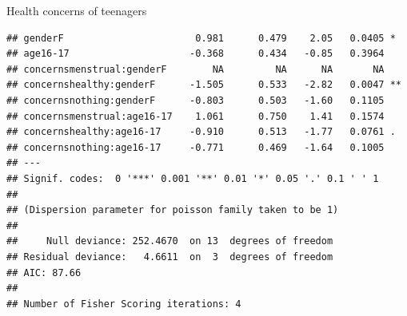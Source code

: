 \documentclass[11pt]{book}\usepackage[]{graphicx}\usepackage[]{color}
\makeatletter
\newenvironment{kframe}{%
 \def\at@end@of@kframe{}%
 \ifinner\ifhmode%
  \def\at@end@of@kframe{\end{minipage}}%
  \begin{minipage}{\columnwidth}%
 \fi\fi%
 \def\FrameCommand##1{\hskip\@totalleftmargin \hskip-\fboxsep
 \colorbox{shadecolor}{##1}\hskip-\fboxsep
     \hskip-\linewidth \hskip-\@totalleftmargin \hskip\columnwidth}%
 \MakeFramed {\advance\hsize-\width
   \@totalleftmargin\z@ \linewidth\hsize
   \@setminipage}}%
 {\par\unskip\endMakeFramed%
 \at@end@of@kframe}
\newenvironment{knitrout}{}{} %
\renewenvironment{knitrout}{\small\renewcommand{\baselinestretch}{.85}}{} %
\makeatother
\begin{document}
\begin{Example}[health]{Health concerns of teenagers}
\begin{knitrout}
\begin{kframe}
\begin{verbatim}
## genderF                       0.981      0.479    2.05   0.0405 *  
## age16-17                     -0.368      0.434   -0.85   0.3964    
## concernsmenstrual:genderF        NA         NA      NA       NA    
## concernshealthy:genderF      -1.505      0.533   -2.82   0.0047 ** 
## concernsnothing:genderF      -0.803      0.503   -1.60   0.1105    
## concernsmenstrual:age16-17    1.061      0.750    1.41   0.1574    
## concernshealthy:age16-17     -0.910      0.513   -1.77   0.0761 .  
## concernsnothing:age16-17     -0.771      0.469   -1.64   0.1005    
## ---
## Signif. codes:  0 '***' 0.001 '**' 0.01 '*' 0.05 '.' 0.1 ' ' 1
## 
## (Dispersion parameter for poisson family taken to be 1)
## 
##     Null deviance: 252.4670  on 13  degrees of freedom
## Residual deviance:   4.6611  on  3  degrees of freedom
## AIC: 87.66
## 
## Number of Fisher Scoring iterations: 4
\end{verbatim}
\end{kframe}
\end{knitrout}


\end{Example}
\end{document}
